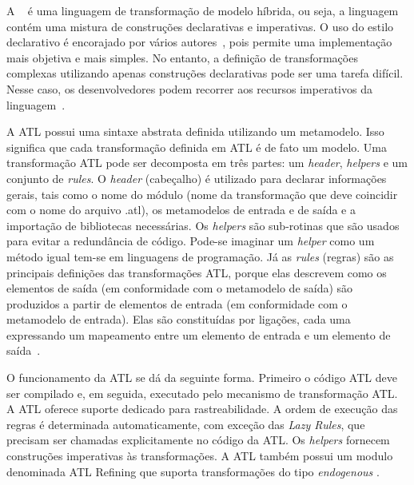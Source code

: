 A ~\cite{ATL_eclipse} é uma linguagem de transformação de modelo híbrida, ou seja, a linguagem contém uma mistura de construções declarativas e imperativas. O uso do estilo declarativo é encorajado por vários autores~\cite{Allilaire_06, Jouault_2005, Jouault_2008}, pois permite uma implementação mais objetiva e mais simples. No entanto, a definição de transformações complexas utilizando apenas construções declarativas pode ser uma tarefa difícil. Nesse caso, os desenvolvedores podem recorrer aos recursos imperativos da linguagem~\cite{Allilaire_06}.

A ATL possui uma sintaxe abstrata definida utilizando um metamodelo. Isso significa que cada transformação definida em ATL é de fato um modelo. Uma transformação ATL pode ser decomposta em três partes: um \textit{header}, \textit{helpers} e um conjunto de \textit{rules}. O \textit{header} (cabeçalho) é utilizado para declarar informações gerais, tais como o nome do módulo (nome da transformação que deve coincidir com o nome do arquivo .atl), os metamodelos de entrada e de saída  e a importação de bibliotecas necessárias. Os \textit{helpers} são sub-rotinas que são usados para evitar a redundância de código. Pode-se imaginar um \textit{helper} como um método igual tem-se em linguagens de programação. Já as \textit{rules} (regras) são as principais definições das transformações ATL, porque elas descrevem como os elementos de saída (em conformidade com o metamodelo de saída) são produzidos a partir de elementos de entrada (em conformidade com o metamodelo de entrada). Elas são constituídas por ligações, cada uma expressando um mapeamento entre um elemento de entrada e um elemento de saída~\cite{ATL_eclipse}.

O funcionamento da ATL se dá da seguinte forma. Primeiro o código ATL deve ser compilado e, em seguida, executado pelo mecanismo de transformação ATL. A ATL oferece suporte dedicado para rastreabilidade. A ordem de execução das regras é determinada automaticamente, com exceção das \textit{Lazy Rules}, que precisam ser chamadas explicitamente no código da ATL. Os \textit{helpers} fornecem construções imperativas às transformações. A ATL também possui um modulo denominada ATL Refining que suporta transformações do tipo \emph{endogenous} .


